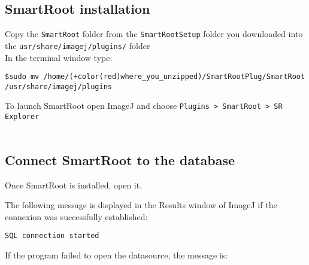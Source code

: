 {\color{coolSubSection}\subsection{SmartRoot installation}}

Copy the \verb|SmartRoot| folder from the \verb|SmartRootSetup| folder you downloaded into the \verb|usr/share/imagej/plugins/| folder\\

\noindent
In the terminal window type:\\

\begin{footnotesize}
\begin{Verbatim}[frame=single, commandchars=+\(\)]
$sudo mv /home/(+color(red)where_you_unzipped)/SmartRootPlug/SmartRoot /usr/share/imagej/plugins
\end{Verbatim}
\end{footnotesize}

\noindent To launch SmartRoot open ImageJ and choose \verb|Plugins > SmartRoot > SR Explorer|\\

\noindent
{}\\


{\color{coolSubSection}\subsection{Connect SmartRoot to the database}}

Once SmartRoot is installed, open it.

\noindent
The following message is displayed in the Results window of ImageJ if the connexion was successfully established:\\

\begin{Verbatim}[frame=single, commandchars=+\(\)]
SQL connection started 
\end{Verbatim}

\noindent If the program failed to open the datasource, the message is:


